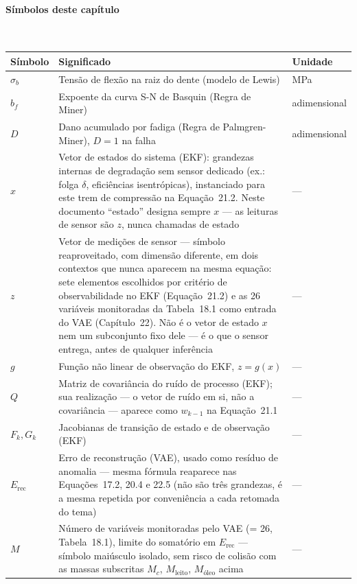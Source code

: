 \documentclass[12pt,a4paper]{article}
\numberwithin{equation}{section}
\numberwithin{table}{section}
\numberwithin{figure}{section}
\begin{document}
{\paragraph{Símbolos deste capítulo}\mbox{}\\[-0.5em]
{\small
\begin{longtable}{>{\raggedright\arraybackslash}p{2.6cm} >{\raggedright\arraybackslash}p{9.2cm} >{\raggedright\arraybackslash}p{2.6cm}}
	\toprule
	\textbf{Símbolo} & \textbf{Significado} & \textbf{Unidade} \\ \midrule
	\endhead
	$\sigma_b$ & Tensão de flexão na raiz do dente (modelo de Lewis) & MPa \\
	$b_f$\dag & Expoente da curva S-N de Basquin (Regra de Miner) & adimensional \\
	$D$ & Dano acumulado por fadiga (Regra de Palmgren-Miner), $D=1$ na falha & adimensional \\
	$x$ & Vetor de estados do sistema (EKF): grandezas internas de degradação sem sensor dedicado (ex.: folga $\delta$, eficiências isentrópicas), instanciado para este trem de compressão na Equação~21.2. Neste documento ``estado'' designa sempre $x$ — as leituras de sensor são $z$, nunca chamadas de estado & --- \\
	$z$ & Vetor de medições de sensor — símbolo reaproveitado, com dimensão diferente, em dois contextos que nunca aparecem na mesma equação: sete elementos escolhidos por critério de observabilidade no EKF (Equação~21.2) e as 26 variáveis monitoradas da Tabela~18.1 como entrada do VAE (Capítulo~22). Não é o vetor de estado $x$ nem um subconjunto fixo dele — é o que o sensor entrega, antes de qualquer inferência & --- \\
	$g$\dag & Função não linear de observação do EKF, $z=g(x)$ & --- \\
	$Q$ & Matriz de covariância do ruído de processo (EKF); sua realização — o vetor de ruído em si, não a covariância — aparece como $w_{k-1}$ na Equação~21.1 & --- \\
	$F_k, G_k$ & Jacobianas de transição de estado e de observação (EKF) & --- \\
	$E_{\text{rec}}$ & Erro de reconstrução (VAE), usado como resíduo de anomalia — mesma fórmula reaparece nas Equações~17.2, 20.4 e 22.5 (não são três grandezas, é a mesma repetida por conveniência a cada retomada do tema) & --- \\
	$M$ & Número de variáveis monitoradas pelo VAE (= 26, Tabela~18.1), limite do somatório em $E_{\text{rec}}$ — símbolo maiúsculo isolado, sem risco de colisão com as massas subscritas $M_c$, $M_{\text{leito}}$, $M_{\text{óleo}}$ acima & --- \\

\end{longtable}}}
\end{document}
